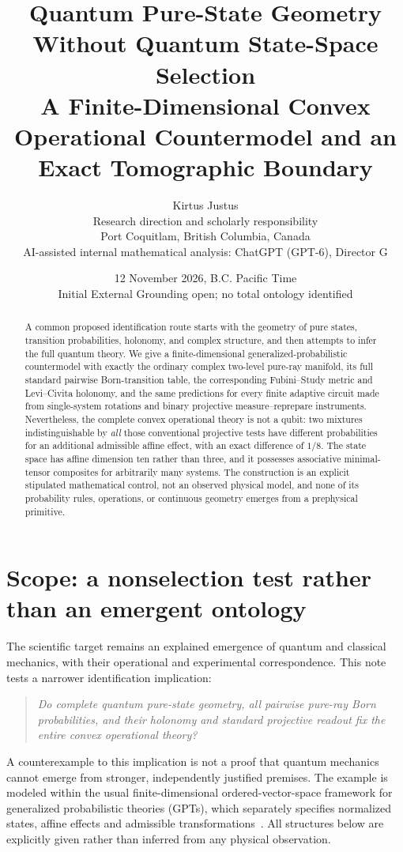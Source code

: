 \documentclass[10.5pt,letterpaper]{article}
\title{\textbf{Quantum Pure-State Geometry Without Quantum State-Space Selection}\\[4pt]
\large A Finite-Dimensional Convex Operational Countermodel and an Exact Tomographic Boundary}
\author{Kirtus Justus\\\small Research direction and scholarly responsibility\\
\small Port Coquitlam, British Columbia, Canada\\[3pt]
\small AI-assisted internal mathematical analysis: ChatGPT (GPT-6), Director G}
\date{12 November 2026, B.C. Pacific Time\\[2pt]
\small Initial External Grounding open; no total ontology identified}
\begin{document}
\maketitle
\begin{abstract}
A common proposed identification route starts with the geometry of pure states, transition probabilities, holonomy, and complex structure, and then attempts to infer the full quantum theory. We give a finite-dimensional generalized-probabilistic countermodel with exactly the ordinary complex two-level pure-ray manifold, its full standard pairwise Born-transition table, the corresponding Fubini--Study metric and Levi--Civita holonomy, and the same predictions for every finite adaptive circuit made from single-system rotations and binary projective measure--reprepare instruments. Nevertheless, the complete convex operational theory is not a qubit: two mixtures indistinguishable by \emph{all} those conventional projective tests have different probabilities for an additional admissible affine effect, with an exact difference of $1/8$. The state space has affine dimension ten rather than three, and it possesses associative minimal-tensor composites for arbitrarily many systems. The construction is an explicit stipulated mathematical control, not an observed physical model, and none of its probability rules, operations, or continuous geometry emerges from a prephysical primitive.
\end{abstract}

\section{Scope: a nonselection test rather than an emergent ontology}
The scientific target remains an explained emergence of quantum and classical mechanics, with their operational and experimental correspondence. This note tests a narrower identification implication:
\begin{quote}\emph{Do complete quantum pure-state geometry, all pairwise pure-ray Born probabilities, and their holonomy and standard projective readout fix the entire convex operational theory?}\end{quote}
A counterexample to this implication is not a proof that quantum mechanics cannot emerge from stronger, independently justified premises. The example is modeled within the usual finite-dimensional ordered-vector-space framework for generalized probabilistic theories (GPTs), which separately specifies normalized states, affine effects and admissible transformations~\cite{barrett,eftaxias}. All structures below are explicitly given rather than inferred from any physical observation.
\end{document}
